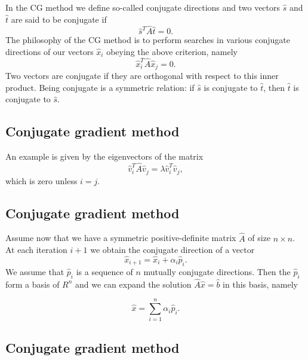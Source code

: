 \documentclass[%
oneside,                 %
final,                   %
10pt]{article}
\begin{document}
In the CG method we define so-called conjugate directions and two vectors 
$\hat{s}$ and $\hat{t}$
are said to be
conjugate if
\begin{equation*}
\hat{s}^T\hat{A}\hat{t}= 0.
\end{equation*}
The philosophy of the CG method is to perform searches in various conjugate directions
of our vectors $\hat{x}_i$ obeying the above criterion, namely
\begin{equation*}
\hat{x}_i^T\hat{A}\hat{x}_j= 0.
\end{equation*}
Two vectors are conjugate if they are orthogonal with respect to 
this inner product. Being conjugate is a symmetric relation: if $\hat{s}$ is conjugate to $\hat{t}$, then $\hat{t}$ is conjugate to $\hat{s}$.

\subsection*{Conjugate gradient method}

An example is given by the eigenvectors of the matrix
\begin{equation*}
\hat{v}_i^T\hat{A}\hat{v}_j= \lambda\hat{v}_i^T\hat{v}_j,
\end{equation*}
which is zero unless $i=j$. 

\subsection*{Conjugate gradient method}

Assume now that we have a symmetric positive-definite matrix $\hat{A}$ of size
$n\times n$. At each iteration $i+1$ we obtain the conjugate direction of a vector
\begin{equation*}
\hat{x}_{i+1}=\hat{x}_{i}+\alpha_i\hat{p}_{i}. 
\end{equation*}
We assume that $\hat{p}_{i}$ is a sequence of $n$ mutually conjugate directions. 
Then the $\hat{p}_{i}$  form a basis of $R^n$ and we can expand the solution 
$  \hat{A}\hat{x} = \hat{b}$ in this basis, namely

\begin{equation*}
  \hat{x}  = \sum^{n}_{i=1} \alpha_i \hat{p}_i.
\end{equation*}

\subsection*{Conjugate gradient method}
\end{document}
